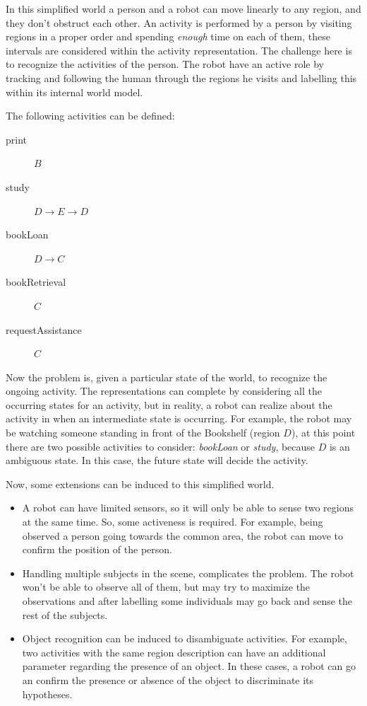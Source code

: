 In this simplified world a person and a robot can move linearly to any region, and they don't obstruct each other.
An activity is performed by a person by visiting regions in a proper order and spending \textit{enough} time on each of them, these intervals are considered within the activity representation.
The challenge here is to recognize the activities of the person.
The robot have an active role by tracking and following the human through the regions he visits and labelling this within its internal world model.

The following activities can be defined:

\begin{description}
\item[print]$B$ 
\item[study]$D \rightarrow E \rightarrow D$
\item[bookLoan]$D \rightarrow C$
\item[bookRetrieval]$C$
\item[requestAssistance]$C$
\end{description}

Now the problem is, given a particular state of the world, to recognize the ongoing activity.
The representations can complete by considering all the occurring states for an activity, but in reality, a robot can realize about the activity in when an intermediate state is occurring. For example, the robot may be watching someone standing in front of the Bookshelf (region $D$), at this point there are two possible activities to consider: \textit{bookLoan} or \textit{study}, because $D$ is an ambiguous state. In this case, the future state will decide the activity.

Now, some extensions can be induced to this simplified world.
\begin{itemize}
\item A robot can have limited sensors, so it will only be able to sense two regions at the same time. 
So, some activeness is required. For example, being observed a person going towards the common area, the robot can move to confirm the position of the person.
\item Handling multiple subjects in the scene, complicates the problem. The robot won't be able to observe all of them, but may try to maximize the observations and after labelling some individuals may go back and sense the rest of the subjects.
\item Object recognition can be induced to disambiguate activities. For example, two activities with the same region description can have an additional parameter regarding the presence of an object. In these cases, a robot can go an confirm the presence or absence of the object to discriminate its hypotheses. 
\end{itemize} 

